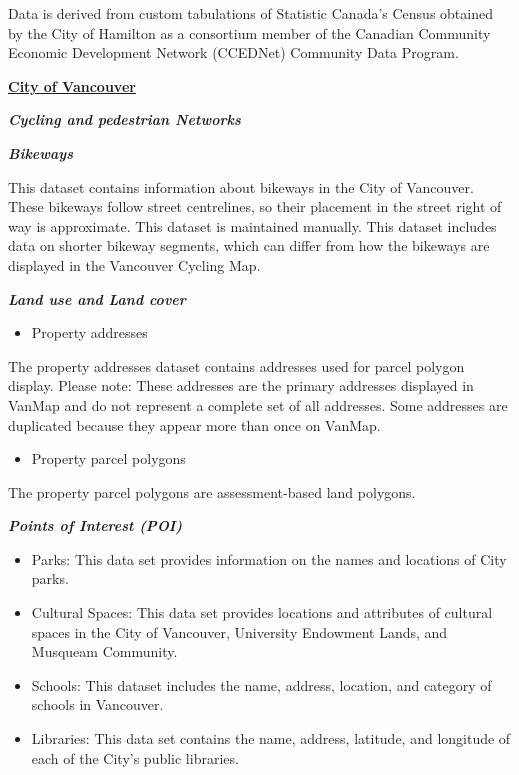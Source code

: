 \documentclass[
11pt, %
oneside, %
english, %
singlespacing, %
]{macthesis} %
\def\tightlist{}
\begin{document}
Data is derived from custom tabulations of Statistic Canada's Census obtained by the City of Hamilton as a consortium member of the Canadian Community Economic Development Network (CCEDNet) Community Data Program.

\textbf{\href{https://opendata.vancouver.ca/explore}{City of Vancouver}}

\textbf{\emph{Cycling and pedestrian Networks}}

\textbf{\emph{Bikeways}}

This dataset contains information about bikeways in the City of Vancouver. These bikeways follow street centrelines, so their placement in the street right of way is approximate. This dataset is maintained manually. This dataset includes data on shorter bikeway segments, which can differ from how the bikeways are displayed in the Vancouver Cycling Map.

\textbf{\emph{Land use and Land cover}}

\begin{itemize}
\tightlist
\item
  Property addresses
\end{itemize}

The property addresses dataset contains addresses used for parcel polygon display. Please note: These addresses are the primary addresses displayed in VanMap and do not represent a complete set of all addresses. Some addresses are duplicated because they appear more than once on VanMap.

\begin{itemize}
\tightlist
\item
  Property parcel polygons
\end{itemize}

The property parcel polygons are assessment-based land polygons.

\textbf{\emph{Points of Interest (POI)}}

\begin{itemize}
\item
  Parks: This data set provides information on the names and locations of City parks.
\item
  Cultural Spaces: This data set provides locations and attributes of cultural spaces in the City of Vancouver, University Endowment Lands, and Musqueam Community.
\item
  Schools: This dataset includes the name, address, location, and category of schools in Vancouver.
\item
  Libraries: This data set contains the name, address, latitude, and longitude of each of the City's public libraries.
\end{itemize}
\end{document}
